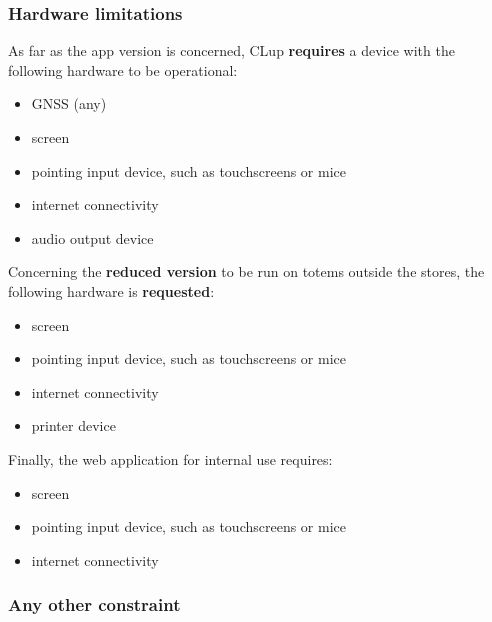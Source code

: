 \subsubsection{Hardware limitations}
As far as the app version is concerned, CLup \textbf{requires} a device with the following hardware to be operational:\newline
\begin{itemize}
    \item GNSS (any)
    \item screen
    \item pointing input device, such as touchscreens or mice
    \item internet connectivity
    \item audio output device
\end{itemize}

\bigskip \noindent Concerning the \textbf{reduced version} to be run on totems outside the stores, the following hardware is \textbf{requested}:\newline
\begin{itemize}
    \item screen
    \item pointing input device, such as touchscreens or mice
    \item internet connectivity
    \item printer device
\end{itemize}

\bigskip \noindent Finally, the web application for internal use requires: \newline
\begin{itemize}
    \item screen
    \item pointing input device, such as touchscreens or mice
    \item internet connectivity
\end{itemize}


\subsubsection{Any other constraint}
